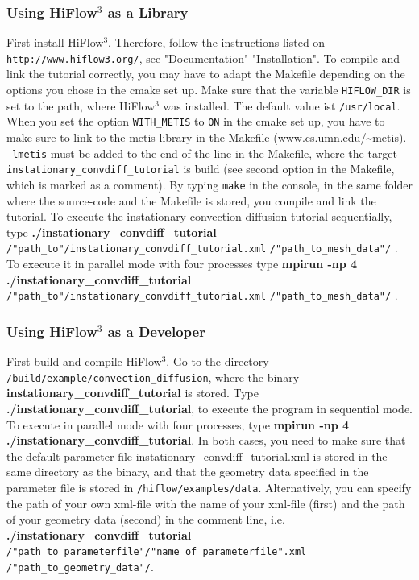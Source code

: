 \documentclass[a4paper, 11pt, twoside]{article}
\begin{document}
\subsubsection{Using HiFlow$^3$ as a Library}\label{sectionlibrary}
First install HiFlow$^3$. Therefore, follow the instructions listed on \verb'http://www.hiflow3.org/', see "Documentation"-"Installation".
To compile and link the tutorial correctly, you may have to adapt the Makefile depending on the options you chose in the cmake set up. Make sure that the variable \verb'HIFLOW_DIR' is set to the path, where HiFlow$^3$ was installed. The default value ist \verb'/usr/local'. When you set the option \verb'WITH_METIS' to \verb'ON' in the cmake set up, you have to make sure to link to the metis library in the Makefile (\url{www.cs.umn.edu/~metis}). \texttt{-lmetis} must be added to the end of the line in the Makefile, where the target 
\texttt{instationary\_convdiff\_tutorial} is build (see second option in the Makefile, which is marked as a comment). By typing \verb'make' in the console, in the same folder where the source-code and the Makefile is stored, you compile and link the tutorial. 
To execute the instationary convection-diffusion tutorial sequentially, type \textbf{./instationary\_convdiff\_tutorial} \verb'/"path_to"/instationary_convdiff_tutorial.xml' \verb'/"path_to_mesh_data"/' . To execute it in parallel mode  with four processes type \newline \textbf{mpirun -np 4 ./instationary\_convdiff\_tutorial} \verb'/"path_to"/instationary_convdiff_tutorial.xml' \verb'/"path_to_mesh_data"/' .

\subsubsection{Using HiFlow$^3$ as a Developer}\label{sectiondeveloper}
First build and compile HiFlow$^3$. Go to the directory \verb'/build/example/convection_diffusion', where the binary \textbf{instationary\_convdiff\_tutorial} is stored. Type \textbf{./instationary\_convdiff\_tutorial}, to execute the program in sequential mode. To execute in parallel mode  with four processes, type \textbf{mpirun -np 4 ./instationary\_convdiff\_tutorial}. In both cases, you need to make sure that the default parameter file instationary\_convdiff\_tutorial.xml is stored in the same directory as the binary, and that the geometry data specified in the parameter file is stored in \verb'/hiflow/examples/data'. Alternatively, you can specify the path of your own xml-file with the name of your xml-file (first) and the path of your geometry data (second) in the comment line, i.e. \newline \textbf{./instationary\_convdiff\_tutorial} \verb'/"path_to_parameterfile"/"name_of_parameterfile".xml'
\verb'/"path_to_geometry_data"/'.
\end{document}
